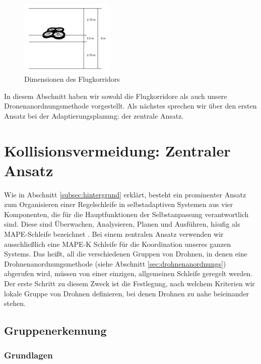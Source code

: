 \documentclass[a4paper,titlepage,onecolumn,twoside,12pt]{article}
\begin{document}
\begin{figure}
\centering
\includegraphics[width = 0.4\textwidth]{Flugkorridore_Dimensionen}
\caption{Dimensionen des Flugkorridors}
\label{fig:drohnenanordnungs_beispiel}
\end{figure}


In diesem Abschnitt haben wir sowohl die Flugkorridore als auch unsere Dronenanordnungsmethode vorgestellt. Als nächstes sprechen wir über den ersten Ansatz bei der Adaptierungsplanung: der zentrale Ansatz.

\section{Kollisionsvermeidung: Zentraler Ansatz}
\label{sec:zentral}

Wie in Abschnitt \ref{subsec:hintergrund} erklärt, besteht ein prominenter Ansatz zum Organisieren einer Regelschleife in selbstadaptiven Systemen aus vier Komponenten, die für die Hauptfunktionen der Selbstanpassung verantwortlich sind. Diese sind Überwachen, Analysieren, Planen und Ausführen, häufig als MAPE-Schleife bezeichnet \cite{Prager1961}. Bei einem zentralen Ansatz verwenden wir ausschließlich eine MAPE-K Schleife für die Koordination unseres ganzen Systems. Das heißt, all die verschiedenen Gruppen von Drohnen, in denen eine Drohnenanordnungsmethode (siehe Abschnitt \ref{sec:drohnenanordnungs}) abgerufen wird, müssen von einer einzigen, allgemeinen Schleife geregelt werden. Der erste Schritt zu diesem Zweck ist die Festlegung, nach welchem Kriterien wir lokale Gruppe von Drohnen definieren, bei denen Drohnen zu nahe beieinander stehen.

\subsection{Gruppenerkennung}
\label{subsec:gruppenerkennung}

\subsubsection{Grundlagen}
\label{subsubsec:grundlagen}
\end{document}
